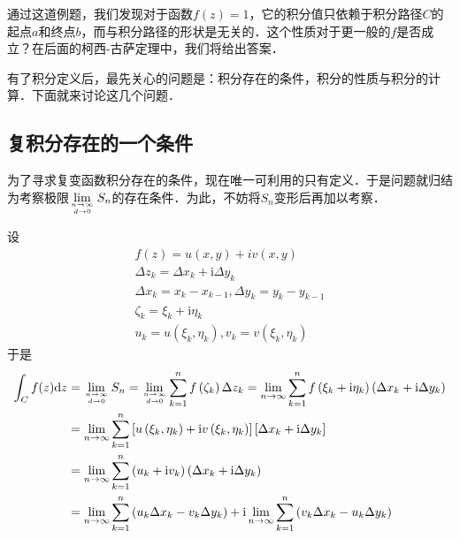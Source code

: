 通过这道例题，我们发现对于函数$f(z)=1$，它的积分值只依赖于积分路径$C$的起点$a$和终点$b$，而与积分路径的形状是无关的．这个性质对于更一般的$f$是否成立？在后面的柯西-古萨定理中，我们将给出答案．

有了积分定义后，最先关心的问题是：积分存在的条件，积分的性质与积分的计算．下面就来讨论这几个问题．

\subsection{复积分存在的一个条件}

为了寻求复变函数积分存在的条件，现在唯一可利用的只有定义．于是问题就归结为考察极限$\displaystyle \lim _{n \rightarrow \infty \atop d \rightarrow 0} S_{n}$的存在条件．为此，不妨将$S_n$变形后再加以考察．

设
\begin{equation}
\begin{array}{l}f(z)=u(x, y)+i v(x, y) \\ \Delta z_{k}=\Delta x_{k}+\mathrm{i} \Delta y_{k} \\ \Delta x_{k}=x_{k}-x_{k-1}, \Delta y_{k}=y_{k}-y_{k-1} \\ \zeta_{k}=\xi_{k}+\mathrm{i} \eta_{k} \\ u_{k}=u\left(\xi_{k}, \eta_{k}\right), v_{k}=v\left(\xi_{k}, \eta_{k}\right)\end{array}
\end{equation}
于是
\begin{equation}
\begin{aligned} \int_{C} f(z) \mathrm{d} z &=\lim _{n \rightarrow \infty \atop d \rightarrow 0} S_{n}=\lim _{n \rightarrow \infty \atop d \rightarrow 0} \sum_{k=1}^{n} f\left(\zeta_{k}\right) \Delta z_{k}=\lim _{n \rightarrow \infty} \sum_{k=1}^{n} f\left(\xi_{k}+\mathrm{i} \eta_{k}\right)\left(\Delta x_{k}+\mathrm{i} \Delta y_{k}\right) \\ &=\lim _{n \rightarrow \infty} \sum_{k=1}^{n}\left[u\left(\xi_{k}, \eta_{k}\right)+\mathrm{i} v\left(\xi_{k}, \eta_{k}\right)\right]\left[\Delta x_{k}+\mathrm{i} \Delta y_{k}\right] \\ &=\lim _{n \rightarrow \infty} \sum_{k=1}^{n}\left(u_{k}+\mathrm{i} v_{k}\right)\left(\Delta x_{k}+\mathrm{i} \Delta y_{k}\right) \\ &=\lim _{n \rightarrow \infty} \sum_{k=1}^{n}\left(u_{k} \Delta x_{k}-v_{k} \Delta y_{k}\right)+\mathrm{i} \lim _{n \rightarrow \infty} \sum_{k=1}^{n}\left(v_{k} \Delta x_{k}-u_{k} \Delta y_{k}\right) \end{aligned}
\end{equation}